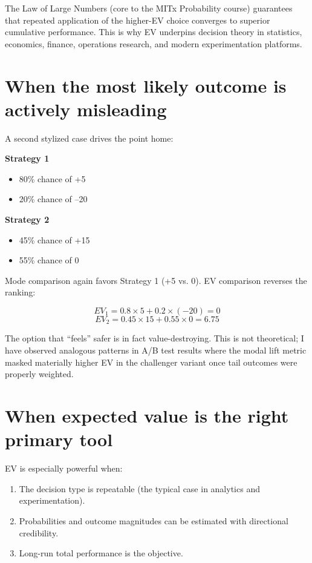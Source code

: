 \documentclass[11pt,a4paper]{article}
\begin{document}
The Law of Large Numbers (core to the MITx Probability course) guarantees that repeated application of the higher-EV choice converges to superior cumulative performance. This is why EV underpins decision theory in statistics, economics, finance, operations research, and modern experimentation platforms.

\section{When the most likely outcome is actively misleading}

A second stylized case drives the point home:

\textbf{Strategy 1}  
\begin{itemize}[noitemsep]
    \item 80\% chance of +5
    \item 20\% chance of –20
\end{itemize}

\textbf{Strategy 2}  
\begin{itemize}[noitemsep]
    \item 45\% chance of +15
    \item 55\% chance of 0
\end{itemize}

Mode comparison again favors Strategy 1 (+5 vs. 0).  
EV comparison reverses the ranking:

\[
EV_1 = 0.8 \times 5 + 0.2 \times (-20) = 0
\]
\[
EV_2 = 0.45 \times 15 + 0.55 \times 0 = 6.75
\]

The option that “feels” safer is in fact value-destroying. This is not theoretical; I have observed analogous patterns in A/B test results where the modal lift metric masked materially higher EV in the challenger variant once tail outcomes were properly weighted.

\section{When expected value is the right primary tool}

EV is especially powerful when:
\begin{enumerate}[noitemsep]
    \item The decision type is repeatable (the typical case in analytics and experimentation).
    \item Probabilities and outcome magnitudes can be estimated with directional credibility.
    \item Long-run total performance is the objective.
\end{enumerate}
\end{document}
